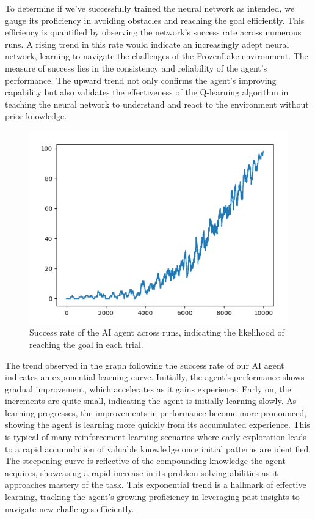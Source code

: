 \documentclass[10pt,twocolumn]{article}
\begin{document}
    To determine if we've successfully trained the neural network as intended, we gauge its proficiency in avoiding obstacles and reaching the goal efficiently. This efficiency is quantified by observing the network's success rate across numerous runs. A rising trend in this rate would indicate an increasingly adept neural network, learning to navigate the challenges of the FrozenLake environment. The measure of success lies in the consistency and reliability of the agent's performance. The upward trend not only confirms the agent's improving capability but also validates the effectiveness of the Q-learning algorithm in teaching the neural network to understand and react to the environment without prior knowledge.

    \begin{figure}[ht]
    \centering
    \includegraphics[width=0.75\linewidth]{rl_success.PNG}
    \caption{Success rate of the AI agent across runs, indicating the likelihood of reaching the goal in each trial.}
    \label{fig:successrate}
    \end{figure}

    
    The trend observed in the graph following the success rate of our AI agent indicates an exponential learning curve. Initially, the agent's performance shows gradual improvement, which accelerates as it gains experience. Early on, the increments are quite small, indicating the agent is initially learning slowly. As learning progresses, the improvements in performance become more pronounced, showing the agent is learning more quickly from its accumulated experience. This is typical of many reinforcement learning scenarios where early exploration leads to a rapid accumulation of valuable knowledge once initial patterns are identified. The steepening curve is reflective of the compounding knowledge the agent acquires, showcasing a rapid increase in its problem-solving abilities as it approaches mastery of the task. This exponential trend is a hallmark of effective learning, tracking the agent's growing proficiency in leveraging past insights to navigate new challenges efficiently.
\end{document}
